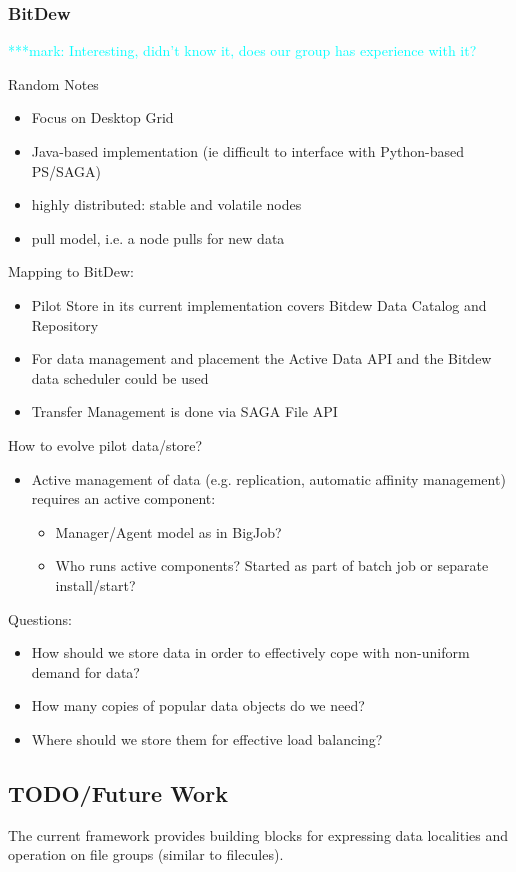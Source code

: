 \documentclass[]{article}
\newcommand{\msnote}[1]{ {\textcolor{cyan} { ***mark: #1 }}}
\begin{document}
\subsubsection{BitDew}
\msnote{Interesting, didn't know it, does our group has experience with it?}

Random Notes
\begin{itemize}
	\item Focus on Desktop Grid
	\item Java-based implementation (ie difficult to interface with Python-based PS/SAGA)
	\item highly distributed: stable and volatile nodes
	\item pull model, i.e. a node pulls for new data
\end{itemize}


Mapping to BitDew:
\begin{itemize}
	\item Pilot Store in its current implementation covers Bitdew Data Catalog and Repository
	\item For data management and placement the Active Data API and the Bitdew data scheduler could be used
	\item Transfer Management is done via SAGA File API	
\end{itemize}

How to evolve pilot data/store?
\begin{itemize}
	\item Active management of data (e.g. replication, automatic affinity management) requires an active component:
	\begin{itemize}
		\item Manager/Agent model as in BigJob?
		\item Who runs active components? Started as part of batch job or separate install/start?
	\end{itemize}
\end{itemize}

Questions:
\begin{itemize}
    \item How should
    we store data in order to effectively cope with non-uniform demand for
    data? 
    \item How many copies of popular data objects do we need? 
    \item Where should we store them for effective load balancing?
\end{itemize}

\subsection{TODO/Future Work}
The current framework provides building blocks for expressing data localities and operation on file groups (similar to filecules).
\end{document}
